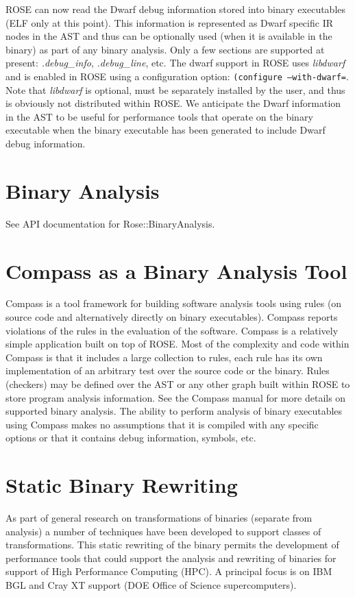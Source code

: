   ROSE can now read the Dwarf debug information stored into binary executables (ELF only
at this point). This information is represented as Dwarf specific IR nodes in the AST and
thus can be optionally used (when it is available in the binary) as part of any binary 
analysis.  Only a few sections are supported at present: {\em .debug\_info},
{\em .debug\_line}, etc.  The dwarf support in ROSE uses {\em libdwarf} and is enabled in
ROSE using a configuration option: {\tt (configure --with-dwarf={\em<path to libdwarf>}}.
Note that {\em libdwarf} is optional, must be separately installed by the user, and
thus is obviously not distributed within ROSE.  
We anticipate the Dwarf information in the AST to be useful for performance tools that
operate on the binary executable when the binary executable has been generated to include 
Dwarf debug information.

\section{Binary Analysis}

See API documentation for Rose::BinaryAnalysis.

\section{Compass as a Binary Analysis Tool}

   Compass is a tool framework for building software analysis tools using rules (on source
code and alternatively directly on binary executables). Compass
reports violations of the rules in the evaluation of the software.  Compass is a
relatively simple application built on top of ROSE.  Most of the complexity and code 
within Compass is that it includes a large collection to rules, each rule has its
own implementation of an arbitrary test over the source code or the binary.  Rules
(checkers) may be defined over the AST or any other graph built within ROSE to store 
program analysis information. See the Compass manual for more details on supported
binary analysis.  The ability to perform analysis of binary executables using Compass 
makes no assumptions that it is compiled with any specific options or that it contains
debug information, symbols, etc.


\section{Static Binary Rewriting}
   As part of general research on transformations of binaries (separate from analysis)
a number of techniques have been developed to support classes of transformations.
This static rewriting of the binary permits the development of performance tools 
that could support the analysis and rewriting of binaries for support of High 
Performance Computing (HPC). A principal focus is on IBM BGL and Cray XT support 
(DOE Office of Science supercomputers).


